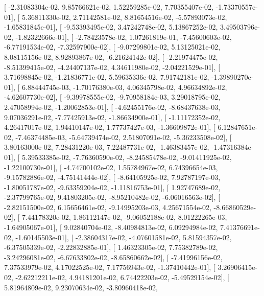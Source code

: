 \documentclass{article}
\begin{document}
       [ -2.31083304e-02,   9.85766621e-02,   1.52259285e-02,
          7.70355407e-02,  -1.73370557e-01],
       [  5.36811330e-02,   2.71142581e-02,   8.81654516e-02,
         -5.57893073e-02,  -1.65831845e-01],
       [ -9.53393495e-02,   3.47242748e-02,   5.13867252e-02,
          3.49503796e-02,  -1.82322666e-01],
       [ -2.78423578e-02,   1.07261819e-01,  -7.45600603e-02,
         -6.77191534e-02,  -7.32597900e-02],
       [ -9.07299801e-02,   5.13125021e-02,   8.08115156e-02,
          8.92893867e-02,  -6.21624142e-02],
       [ -2.21974475e-02,  -8.51399415e-02,  -4.24407137e-02,
          4.34611980e-02,  -2.04221529e-01],
       [  3.71698845e-02,  -1.21836771e-02,   5.59635336e-02,
          7.91742181e-02,  -1.39890270e-01],
       [  6.88444745e-03,  -1.70176380e-03,   4.06345798e-02,
          4.96634892e-02,  -4.62607730e-02],
       [ -9.39978555e-02,  -9.70958184e-03,   3.29018795e-02,
          2.47058994e-02,  -1.20062853e-01],
       [ -4.62455176e-02,  -8.68437638e-03,   9.07036291e-02,
         -7.77425913e-02,  -1.86634900e-01],
       [ -1.11172352e-02,   4.26417017e-02,   1.94410147e-02,
          1.77737427e-03,  -1.36609872e-01],
       [  6.12847651e-02,  -7.46374485e-03,  -5.64739474e-02,
          2.51807091e-02,  -5.36233508e-02],
       [  3.80163000e-02,   7.28431220e-03,   7.22487731e-02,
         -1.46383457e-02,  -1.47316384e-01],
       [  5.39533385e-02,  -7.76360590e-02,  -8.24585478e-02,
         -9.01411925e-02,  -1.22100730e-01],
       [ -4.74700102e-02,   1.55784967e-02,   6.74396654e-03,
         -9.15782886e-02,  -4.75141444e-02],
       [ -8.64105925e-02,   7.92787197e-03,  -1.80051787e-02,
         -9.63359204e-02,  -1.11816753e-01],
       [  1.92747689e-02,  -2.37799765e-02,   9.41803205e-02,
         -8.95210482e-02,  -6.06016563e-02],
       [ -2.82151500e-02,   6.15656461e-02,  -9.14995203e-03,
          4.25671554e-02,  -8.66860529e-02],
       [  7.44178320e-02,   1.86112147e-02,  -9.06052188e-02,
          8.01222265e-03,  -1.64905067e-01],
       [  9.02840704e-02,  -8.40984813e-02,   6.09294984e-02,
          7.41376691e-02,  -1.60145503e-01],
       [ -2.38604317e-02,  -4.07601581e-02,   5.81594357e-02,
         -6.37505339e-02,  -2.22832885e-01],
       [  1.46323305e-02,   7.75382789e-02,  -3.24296081e-02,
         -6.67633802e-02,  -8.65860662e-02],
       [ -7.41996156e-02,   7.37533979e-02,   4.17022525e-02,
          7.17756943e-02,  -1.37410442e-01],
       [  3.26906415e-02,  -2.62212211e-02,   4.94181201e-02,
          6.74422203e-02,  -5.49529154e-02],
       [  5.81964809e-02,   9.23070634e-02,  -3.80960418e-02,
\end{document}
